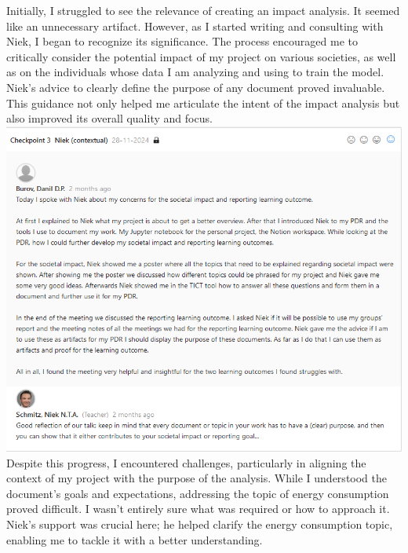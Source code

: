 \documentclass{article}
\begin{document}
	Initially, I struggled to see the relevance of creating an impact analysis. It seemed like an unnecessary artifact. However, as I started writing and consulting with Niek, I began to recognize its significance. The process encouraged me to critically consider the potential impact of my project on various societies, as well as on the individuals whose data I am analyzing and using to train the model. Niek’s advice to clearly define the purpose of any document proved invaluable. This guidance not only helped me articulate the intent of the impact analysis but also 
	improved its overall quality and focus.\\
	  \includegraphics[width=\textwidth,keepaspectratio]{images/Feedback_Niek_1.png}\\
	
	Despite this progress, I encountered challenges, particularly in aligning the context of my project with the purpose of the analysis. While I understood the document’s goals and expectations, addressing the topic of energy consumption proved difficult. I wasn’t entirely sure what was required or how to approach it. Niek’s support was crucial here; he helped clarify the energy consumption topic, enabling me to tackle it with a better understanding.
	
\end{document}
